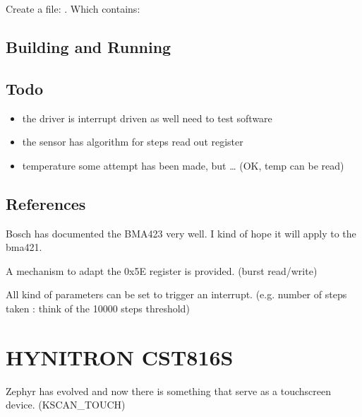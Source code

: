 \documentclass[letterpaper,10pt,english]{sphinxmanual}
\begin{document}
Create a file: .
Which contains:

\begin{sphinxVerbatim}[commandchars=\\\{\}]
 
 
        
        
\end{sphinxVerbatim}


\subsection{Building and Running}
\label{\detokenize{drivers/bma421:building-and-running}}

\subsection{Todo}
\label{\detokenize{drivers/bma421:todo}}\begin{itemize}
\item {} 
the driver is interrupt driven as well \textendash{} need to test software

\item {} 
the sensor has algorithm for steps \textendash{} read out register

\item {} 
temperature some attempt has been made, but … (OK, temp can be read)

\end{itemize}


\subsection{References}
\label{\detokenize{drivers/bma421:references}}
Bosch has documented the BMA423 very well.
I kind of hope it will apply to the bma421.

A mechanism to adapt the 0x5E register is provided.
(burst read/write)

All kind of parameters can be set to trigger an interrupt.
(e.g. number of steps taken : think of the 10000 steps threshold)


\section{HYNITRON CST816S}
\label{\detokenize{drivers/cst816s:hynitron-cst816s}}\label{\detokenize{drivers/cst816s::doc}}
Zephyr has evolved and now there is something that serve as a touchscreen device.
(KSCAN\_TOUCH)
\end{document}
